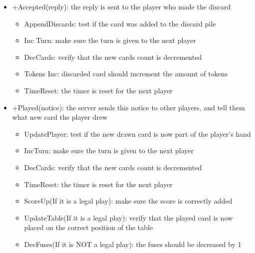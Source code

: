 \documentclass[12pt]{article}
\begin{document}
\begin{description}
\begin{itemize}
\begin{itemize}
		\end{itemize}
		\item +Accepted(reply): the reply is sent to the player who made the discard
		\begin{itemize}
		    \item AppendDiscards: test if the card was added to the discard pile
		    \item Inc Turn: make sure the turn is given to the next player
		    \item DecCards: verify that the new cards count is decremented
		    \item Tokens Inc: discarded card should increment the amount of tokens
		    \item TimeReset: the timer is reset for the next player
		\end{itemize}
		
		\item +Played(notice): the server sends this notice to other players, and tell them what new card the player drew 
			\begin{itemize}
		    	\item UpdatePlayer: test if the new drawn card is now part of the player's hand
		    	\item IncTurn: make sure the turn is given to the next player
		    	\item DecCards: verify that the new cards count is decremented
		    	\item TimeReset: the timer is reset for the next player
			\item ScoreUp(If it is a legal play): make sure the score is correctly added
			\item UpdateTable(If it is a legal play): verify that the played card is now placed on the correct position of the table
			\item DecFuses(If it is NOT a legal play): the fuses should be decreased by 1
    			\end{itemize}


\end{itemize}
\end{description}
\end{document}
